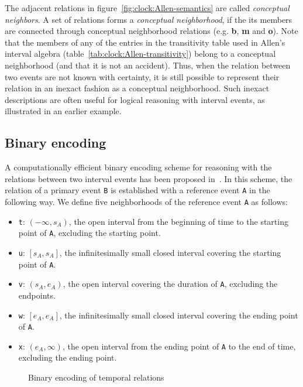 The adjacent relations in figure~\ref{fig:clock:Allen-semantics} are called {\em conceptual neighbors}. A set of relations forms 
a {\em conceptual neighborhood}, if the its members are connected through conceptual neighborhood relations (e.g. {\bf b}, {\bf m} and 
{\bf o}).  Note that the members of any of the entries in the transitivity table used in Allen's interval algebra 
(table~\ref{tab:clock:Allen-transitivity}) belong to a conceptual neighborhood (and that it is not an accident). 
%
Thus, when the relation between two events are not known with certainty, it is still possible to represent their relation in an 
inexact fashion as a conceptual neighborhood. Such inexact descriptions are often useful for logical reasoning with interval events, 
as illustrated in an earlier example.

\subsection{Binary encoding}

A computationally efficient binary encoding scheme for reasoning with the relations between two interval events has been proposed 
in~\cite{Papadias:2001}. In this scheme, the relation of a primary event \texttt{B} is established with a reference event \texttt{A}
in the following way. We define five neighborhoods of the reference event \texttt{A} as follows:

\begin{itemize}
	\item \texttt{t}: $(-\infty, s_A)$, the open interval from the beginning of time to the starting point of \texttt{A}, excluding 
		the starting point.
	\item \texttt{u}: $[s_A, s_A]$, the infinitesimally small closed interval covering the starting point of \texttt{A}.
	\item \texttt{v}: $(s_A, e_A)$, the open interval covering the duration of \texttt{A}, excluding the endpoints.
	\item \texttt{w}: $[e_A, e_A]$, the infinitesimally small closed interval covering the ending point of \texttt{A}.
	\item \texttt{x}: $(e_A, \infty)$, the open interval from the ending point of \texttt{A} to the end of time, excluding 
		the ending point.
\end{itemize}

\begin{figure}[htbp!]
	\centerline{
	}
	\caption{Binary encoding of temporal relations}
	\label{fig:clock:Papadias}
\end{figure}
 
